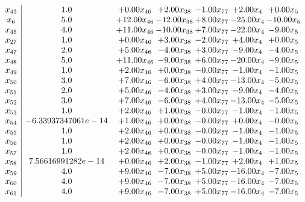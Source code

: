\documentclass[8pt]{article}
\begin{document}
\[\begin{array}{c| c c@{\hskip 2pt} c@{\hskip 2pt} c@{\hskip 2pt} c@{\hskip 2pt} c@{\hskip 2pt} }
 x_{43}   &  1.0 & +  0.00 x_{46} & +  2.00 x_{38} & -1.00 x_{77} & +  2.00 x_{4} & +  0.00 x_{5}\\
 x_{6}   &  5.0 & + 12.00 x_{46} & -12.00 x_{38} & +  8.00 x_{77} & -25.00 x_{4} & -10.00 x_{5}\\
 x_{45}   &  4.0 & + 11.00 x_{46} & -10.00 x_{38} & +  7.00 x_{77} & -22.00 x_{4} & -9.00 x_{5}\\
 x_{27}   &  1.0 & +  0.00 x_{46} & +  3.00 x_{38} & -2.00 x_{77} & +  4.00 x_{4} & +  0.00 x_{5}\\
 x_{47}   &  2.0 & +  5.00 x_{46} & -4.00 x_{38} & +  3.00 x_{77} & -9.00 x_{4} & -4.00 x_{5}\\
 x_{48}   &  5.0 & + 11.00 x_{46} & -9.00 x_{38} & +  6.00 x_{77} & -20.00 x_{4} & -9.00 x_{5}\\
 x_{49}   &  1.0 & +  2.00 x_{46} & +  0.00 x_{38} & -0.00 x_{77} & -1.00 x_{4} & -1.00 x_{5}\\
 x_{50}   &  3.0 & +  7.00 x_{46} & -6.00 x_{38} & +  4.00 x_{77} & -13.00 x_{4} & -5.00 x_{5}\\
 x_{51}   &  2.0 & +  5.00 x_{46} & -4.00 x_{38} & +  3.00 x_{77} & -9.00 x_{4} & -4.00 x_{5}\\
 x_{52}   &  3.0 & +  7.00 x_{46} & -6.00 x_{38} & +  4.00 x_{77} & -13.00 x_{4} & -5.00 x_{5}\\
 x_{53}   &  1.0 & +  2.00 x_{46} & +  1.00 x_{38} & -0.00 x_{77} & -1.00 x_{4} & -1.00 x_{5}\\
 x_{54}   &  -6.33937347061e-14 & +  1.00 x_{46} & +  0.00 x_{38} & -0.00 x_{77} & +  0.00 x_{4} & -0.00 x_{5}\\
 x_{55}   &  1.0 & +  2.00 x_{46} & +  0.00 x_{38} & -0.00 x_{77} & -1.00 x_{4} & -1.00 x_{5}\\
 x_{56}   &  1.0 & +  2.00 x_{46} & +  0.00 x_{38} & -0.00 x_{77} & -1.00 x_{4} & -1.00 x_{5}\\
 x_{57}   &  1.0 & +  2.00 x_{46} & +  0.00 x_{38} & -0.00 x_{77} & -1.00 x_{4} & -1.00 x_{5}\\
 x_{58}   &  7.56616991282e-14 & +  0.00 x_{46} & +  2.00 x_{38} & -1.00 x_{77} & +  2.00 x_{4} & +  1.00 x_{5}\\
 x_{59}   &  4.0 & +  9.00 x_{46} & -7.00 x_{38} & +  5.00 x_{77} & -16.00 x_{4} & -7.00 x_{5}\\
 x_{60}   &  4.0 & +  9.00 x_{46} & -7.00 x_{38} & +  5.00 x_{77} & -16.00 x_{4} & -7.00 x_{5}\\
 x_{61}   &  4.0 & +  9.00 x_{46} & -7.00 x_{38} & +  5.00 x_{77} & -16.00 x_{4} & -7.00 x_{5}\\

\end{array}\]
\end{document}
